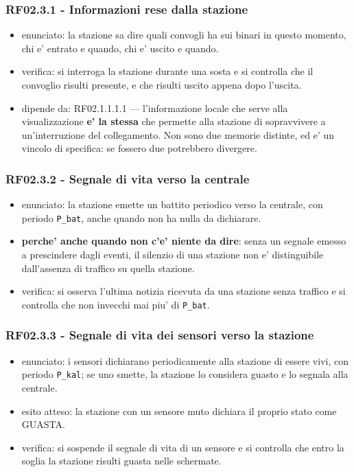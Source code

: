 \documentclass[11pt]{article}
\begin{document}
\subsubsection{RF02.3.1 - Informazioni rese dalla stazione}
\label{sec:orge6d6c47}
\begin{itemize}
\item enunciato: la stazione sa dire quali convogli ha sui binari in questo momento, chi e' entrato e
quando, chi e' uscito e quando.
\item verifica: si interroga la stazione durante una sosta e si controlla che il convoglio risulti
presente, e che risulti uscito appena dopo l'uscita.
\item dipende da: RF02.1.1.1.1 — l'informazione locale che serve alla visualizzazione \textbf{e' la stessa} che
permette alla stazione di sopravvivere a un'interruzione del collegamento. Non sono due memorie
distinte, ed e' un vincolo di specifica: se fossero due potrebbero divergere.
\end{itemize}
\subsubsection{RF02.3.2 - Segnale di vita verso la centrale}
\label{sec:org4d904bf}
\begin{itemize}
\item enunciato: la stazione emette un battito periodico verso la centrale, con periodo \texttt{P\_bat}, anche
quando non ha nulla da dichiarare.
\item \textbf{perche' anche quando non c'e' niente da dire}: senza un segnale emesso a prescindere dagli eventi,
il silenzio di una stazione non e' distinguibile dall'assenza di traffico su quella stazione.
\item verifica: si osserva l'ultima notizia ricevuta da una stazione senza traffico e si controlla che
non invecchi mai piu' di \texttt{P\_bat}.
\end{itemize}
\subsubsection{RF02.3.3 - Segnale di vita dei sensori verso la stazione}
\label{sec:orge610c9e}
\begin{itemize}
\item enunciato: i sensori dichiarano periodicamente alla stazione di essere vivi, con periodo \texttt{P\_kal};
se uno smette, la stazione lo considera guasto e lo segnala alla centrale.
\item esito atteso: la stazione con un sensore muto dichiara il proprio stato come GUASTA.
\item verifica: si sospende il segnale di vita di un sensore e si controlla che entro la soglia la
stazione risulti guasta nelle schermate.
\end{itemize}
\end{document}
